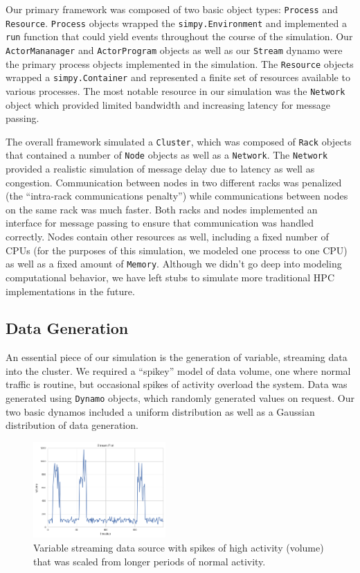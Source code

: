 \documentclass[conference,twocolumn,10pt]{IEEEtran}
\begin{document}
Our primary framework was composed of two basic object types: \texttt{Process} and \texttt{Resource}. \texttt{Process} objects wrapped the \texttt{simpy.Environment} and implemented a \texttt{run} function that could yield events throughout the course of the simulation. Our \texttt{ActorMananager} and \texttt{ActorProgram} objects as well as our \texttt{Stream} dynamo were the primary process objects implemented in the simulation. The \texttt{Resource} objects wrapped a \texttt{simpy.Container} and represented a finite set of resources available to various processes. The most notable resource in our simulation was the \texttt{Network} object which provided limited bandwidth and increasing latency for message passing.

The overall framework simulated a \texttt{Cluster}, which was composed of \texttt{Rack} objects that contained a number of \texttt{Node} objects as well as a \texttt{Network}. The \texttt{Network} provided a realistic simulation of message delay due to latency as well as congestion. Communication between nodes in two different racks was penalized (the ``intra-rack communications penalty'') while communications between nodes on the same rack was much faster. Both racks and nodes implemented an interface for message passing to ensure that communication was handled correctly. Nodes contain other resources as well, including a fixed number of CPUs (for the purposes of this simulation, we modeled one process to one CPU) as well as a fixed amount of \texttt{Memory}. Although we didn't go deep into modeling computational behavior, we have left stubs to simulate more traditional HPC implementations in the future.

\subsection{Data Generation}

An essential piece of our simulation is the generation of variable, streaming data into the cluster. We required a ``spikey'' model of data volume, one where normal traffic is routine, but occasional spikes of activity overload the system. Data was generated using \texttt{Dynamo} objects, which randomly generated values on request. Our two basic dynamos included a uniform distribution as well as a Gaussian distribution of data generation.

\begin{figure}[!t]
    \centering
    \includegraphics[width=0.45\textwidth]{streaming}
    \caption{Variable streaming data source with spikes of high activity (volume) that was scaled from longer periods of normal activity. }
    \label{fig:streaming}
\end{figure}
\end{document}
